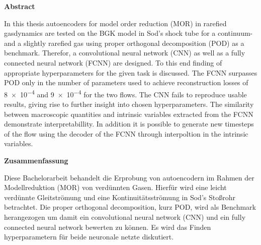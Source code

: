 

%
%
{
\pagestyle{empty}
\begin{center}
{\sffamily \bfseries\Large Abstract}\\
\end{center}%
\vspace{1cm}
%
In this thesis autoencoders for model order reduction (MOR) in rarefied gasdynamics are tested on the BGK model in Sod's shock tube for a continuum- and a slightly rarefied gas using proper orthogonal decomposition (POD) as a benchmark. Therefor, a convolutional neural network (CNN) as well as a fully connected neural network (FCNN) are designed. To this end finding of appropriate hyperparameters for the given task is discussed. The FCNN surpasses POD only in the number of parameters used to achieve reconstruction losses of \num{8e-4} and \num{9e-4} for the two flows. The CNN fails to reproduce usable results, giving rise to further insight into chosen hyperparameters. The similarity between macroscopic quantities and intrinsic variables extracted from the FCNN demonstrate interpretabillity. In addition it is possible to generate new timesteps of the flow using the decoder of the FCNN through interpoltion in the intrinsic variables.         
\vspace{1.5cm}

%
\begin{center}
{\sffamily \bfseries\Large Zusammenfassung}\\
\end{center}%
\vspace{1cm}
%
Diese Bachelorarbeit behandelt die Erprobung von autoencodern im Rahmen der Modellreduktion (MOR) von verdünnten Gasen. Hierfür wird eine leicht verdünnte Gleitströmung und eine Kontinuitätsströmung in Sod's Stoßrohr betrachtet. Die proper orthogonal decomposition, kurz POD, wird als Benchmark herangezogen um damit ein convolutional neural network (CNN) und ein fully connected neural network bewerten zu können. Es wird das Finden hyperparametern für beide neuronale netzte diskutiert.   

\newpage
\pagestyle{plain}
}